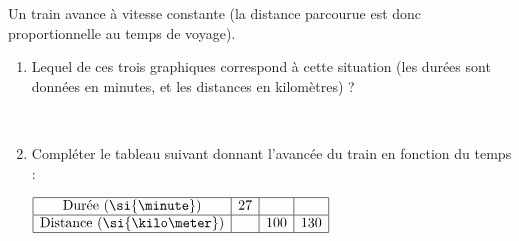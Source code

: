 
\begin{exercice}\label{exo2smath-0096}

    Un train avance à vitesse constante (la distance parcourue est donc proportionnelle au temps de voyage). 
    
    \begin{enumerate}
        \item
            
    Lequel de ces trois graphiques correspond à cette situation (les durées sont données en minutes, et les distances en kilomètres) ?

    \begin{center}
   
   \\
   
    \end{center}

 \item

Compléter le tableau suivant donnant l'avancée du train en fonction du temps :
\begin{center}
$
    \begin{array}[]{|c|c|c|c|}
          \hline
          \text{Durée (\si{\minute})}&27&&\\
        \hline
        \text{Distance (\si{\kilo\meter})}&&100&130\\
          \hline
    \end{array}
    $
\end{center}
    \end{enumerate}

\end{exercice}
